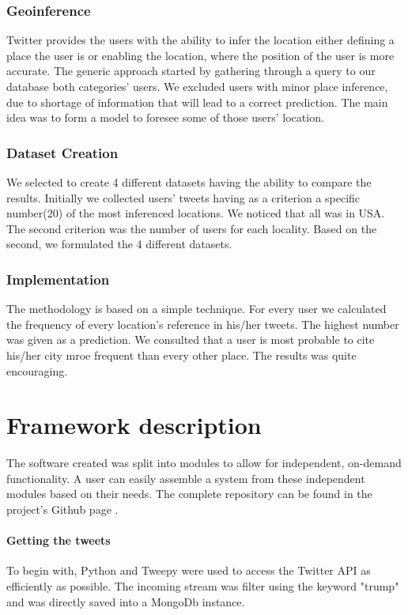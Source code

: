 \documentclass[12pt,svgnames]{report}
\begin{document}
\subsection*{Geoinference}
Twitter provides the users with the ability to infer the location either defining a place the user is or enabling the location, where the position of the user is more accurate. The generic approach started by gathering through a query to our database both categories' users. We excluded users with minor place inference, due to shortage of information that will lead to a correct prediction. The main idea was to form a model to foresee some of those users' location.

\subsection*{Dataset Creation}
We selected to create 4 different datasets having the ability to compare the results. Initially we collected users' tweets having as a criterion a specific number(20) of the most inferenced locations. We noticed that all was in USA. The second criterion was the number of users for each locality. Based on the second, we formulated the 4 different datasets. 

\subsection*{Implementation}
The methodology is based on a simple technique. For every user we calculated the frequency of every location's reference in his/her tweets. The highest number was given as a prediction. We consulted that a user is most probable to cite his/her city mroe frequent than every other place. The results was quite encouraging.

\chapter{Framework description}
\label{chap:framework}
The software created was split into modules to allow for independent, on-demand functionality. A user can easily assemble a system from these independent modules based on their needs. The complete repository can be found in the project's Github page \cite{projectgithub}.
\subsubsection*{Getting the tweets}
To begin with, Python and Tweepy \cite{tweepy} were used to access the Twitter API as efficiently as possible. The incoming stream was filter using the keyword "trump" and was directly saved into a MongoDb instance.
\end{document}
